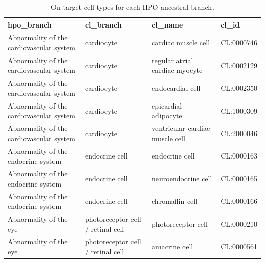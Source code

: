 \documentclass[
]{article}
\begin{document}
\begin{longtable}[]{@{}
  >{\raggedright\arraybackslash}p{}
  >{\raggedright\arraybackslash}p{}
  >{\raggedright\arraybackslash}p{}
  >{\raggedright\arraybackslash}p{}@{}}

\caption{\label{tbl-celltypes}On-target cell types for each HPO
ancestral branch.}

\tabularnewline

\toprule\noalign{}
\begin{minipage}[b]{\linewidth}\raggedright
hpo\_branch
\end{minipage} & \begin{minipage}[b]{\linewidth}\raggedright
cl\_branch
\end{minipage} & \begin{minipage}[b]{\linewidth}\raggedright
cl\_name
\end{minipage} & \begin{minipage}[b]{\linewidth}\raggedright
cl\_id
\end{minipage} \\
\midrule\noalign{}
\endhead
\bottomrule\noalign{}
\endlastfoot
Abnormality of the cardiovascular system & cardiocyte & cardiac muscle
cell & CL:0000746 \\
Abnormality of the cardiovascular system & cardiocyte & regular atrial
cardiac myocyte & CL:0002129 \\
Abnormality of the cardiovascular system & cardiocyte & endocardial cell
& CL:0002350 \\
Abnormality of the cardiovascular system & cardiocyte & epicardial
adipocyte & CL:1000309 \\
Abnormality of the cardiovascular system & cardiocyte & ventricular
cardiac muscle cell & CL:2000046 \\
Abnormality of the endocrine system & endocrine cell & endocrine cell &
CL:0000163 \\
Abnormality of the endocrine system & endocrine cell & neuroendocrine
cell & CL:0000165 \\
Abnormality of the endocrine system & endocrine cell & chromaffin cell &
CL:0000166 \\
Abnormality of the eye & photoreceptor cell / retinal cell &
photoreceptor cell & CL:0000210 \\
Abnormality of the eye & photoreceptor cell / retinal cell & amacrine
cell & CL:0000561 \\

\end{longtable}
\end{document}
